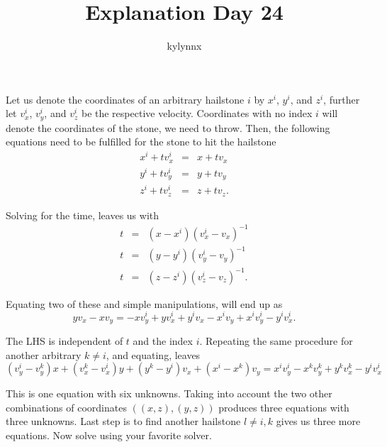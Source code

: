 \documentclass[a4paper]{article}
\title{Explanation Day 24}
\author{kylynnx}
\date{}
\begin{document}
    \maketitle

    Let us denote the coordinates of an arbitrary hailstone $i$ by $x^i$, $y^i$, and $z^i$, further let $v_x^i$,
    $v_y^i$, and $v_z^i$ be the respective velocity.
    Coordinates with no index $i$ will denote the coordinates of the stone, we need to throw.
    Then, the following equations need to be fulfilled for the stone to hit the hailstone
    \begin{eqnarray*}
        x^i + t v_x^i & = & x + t v_x \\
        y^i + t v_y^i & = & y + t v_y \\
        z^i + t v_z^i & = & z + t v_z.
    \end{eqnarray*}

    Solving for the time, leaves us with
    \begin{eqnarray*}
        t & = & \left(x - x^i\right) \left(v_x^i - v_x\right)^{-1} \\
        t & = & \left(y - y^i\right) \left(v_y^i - v_y\right)^{-1} \\
        t & = & \left(z - z^i\right) \left(v_z^i - v_z\right)^{-1}.
    \end{eqnarray*}

    Equating two of these and simple manipulations, will end up as
    \begin{equation*}
        y v_x - x v_y = -x v_y^i + y v_x^i + y^i v_x - x^i v_y + x^i v_y^i - y^i v_x^i.
    \end{equation*}

    The LHS is independent of $t$ and the index $i$.
    Repeating the same procedure for another arbitrary $k \neq i$, and equating, leaves
    \begin{equation*}
        \left(v_y^i - v_y^k\right) x + \left(v_x^k - v_x^i\right) y + \left(y^k - y^i\right) v_x + \left(x^i - x^k\right) v_y
        = x^i v_y^i - x^k v_y^k + y^k v_x^k - y^i v_x^i
    \end{equation*}

    This is one equation with six unknowns.
    Taking into account the two other combinations of coordinates $\left(\left(x, z\right), \left(y, z\right)\right)$
    produces three equations with three unknowns.
    Last step is to find another hailstone $l \neq i,k$ gives us three more equations.
    Now solve using your favorite solver.
\end{document}
